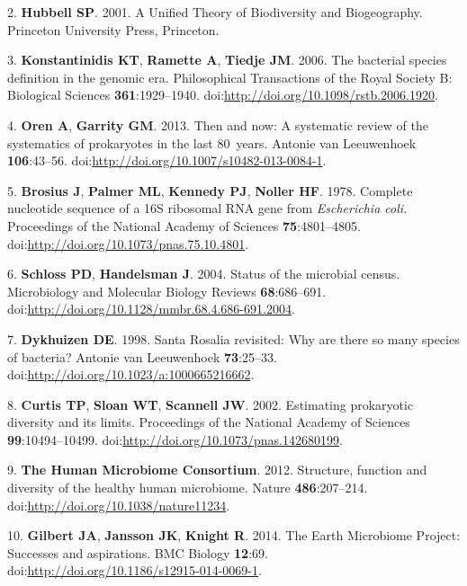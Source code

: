 \documentclass[11pt,]{article}
\begin{document}
2. \textbf{Hubbell SP}. 2001. A Unified Theory of Biodiversity and
Biogeography. Princeton University Press, Princeton.

3. \textbf{Konstantinidis KT}, \textbf{Ramette A}, \textbf{Tiedje JM}.
2006. The bacterial species definition in the genomic era. Philosophical
Transactions of the Royal Society B: Biological Sciences
\textbf{361}:1929--1940.
doi:\url{http://doi.org/10.1098/rstb.2006.1920}.

4. \textbf{Oren A}, \textbf{Garrity GM}. 2013. Then and now: A
systematic review of the systematics of prokaryotes in the last
80~years. Antonie van Leeuwenhoek \textbf{106}:43--56.
doi:\url{http://doi.org/10.1007/s10482-013-0084-1}.

5. \textbf{Brosius J}, \textbf{Palmer ML}, \textbf{Kennedy PJ},
\textbf{Noller HF}. 1978. Complete nucleotide sequence of a 16S
ribosomal RNA gene from \emph{Escherichia coli.} Proceedings of the
National Academy of Sciences \textbf{75}:4801--4805.
doi:\url{http://doi.org/10.1073/pnas.75.10.4801}.

6. \textbf{Schloss PD}, \textbf{Handelsman J}. 2004. Status of the
microbial census. Microbiology and Molecular Biology Reviews
\textbf{68}:686--691.
doi:\url{http://doi.org/10.1128/mmbr.68.4.686-691.2004}.

7. \textbf{Dykhuizen DE}. 1998. Santa Rosalia revisited: Why are there
so many species of bacteria? Antonie van Leeuwenhoek \textbf{73}:25--33.
doi:\url{http://doi.org/10.1023/a:1000665216662}.

8. \textbf{Curtis TP}, \textbf{Sloan WT}, \textbf{Scannell JW}. 2002.
Estimating prokaryotic diversity and its limits. Proceedings of the
National Academy of Sciences \textbf{99}:10494--10499.
doi:\url{http://doi.org/10.1073/pnas.142680199}.

9. \textbf{The Human Microbiome Consortium}. 2012. Structure, function
and diversity of the healthy human microbiome. Nature
\textbf{486}:207--214. doi:\url{http://doi.org/10.1038/nature11234}.

10. \textbf{Gilbert JA}, \textbf{Jansson JK}, \textbf{Knight R}. 2014.
The Earth Microbiome Project: Successes and aspirations. BMC Biology
\textbf{12}:69. doi:\url{http://doi.org/10.1186/s12915-014-0069-1}.
\end{document}
